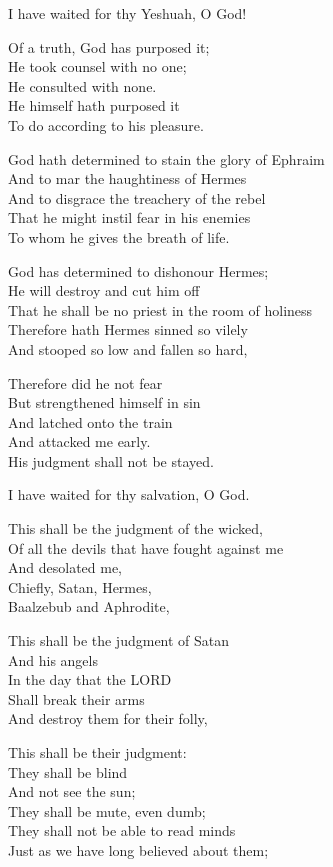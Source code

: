 \documentclass[
]{book}
\begin{document}
I have waited for thy Yeshuah, O God!

Of a truth, God has purposed it;\\
He took counsel with no one;\\
He consulted with none.\\
He himself hath purposed it\\
To do according to his pleasure.

God hath determined to stain the glory of Ephraim\\
And to mar the haughtiness of Hermes\\
And to disgrace the treachery of the rebel\\
That he might instil fear in his enemies\\
To whom he gives the breath of life.

God has determined to dishonour Hermes;\\
He will destroy and cut him off\\
That he shall be no priest in the room of holiness\\
Therefore hath Hermes sinned so vilely\\
And stooped so low and fallen so hard,

Therefore did he not fear\\
But strengthened himself in sin\\
And latched onto the train\\
And attacked me early.\\
His judgment shall not be stayed.

I have waited for thy salvation, O God.

This shall be the judgment of the wicked,\\
Of all the devils that have fought against me\\
And desolated me,\\
Chiefly, Satan, Hermes,\\
Baalzebub and Aphrodite,

This shall be the judgment of Satan\\
And his angels\\
In the day that the LORD\\
Shall break their arms\\
And destroy them for their folly,

This shall be their judgment:\\
They shall be blind\\
And not see the sun;\\
They shall be mute, even dumb;\\
They shall not be able to read minds\\
Just as we have long believed about them;
\end{document}
